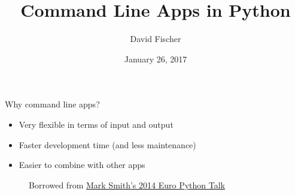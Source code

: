 \documentclass[handout]{beamer}
\title{Command Line Apps in Python}
\author{David Fischer}
\date{January 26, 2017}
\begin{document}
\maketitle

\begin{frame}
\frametitle{}
  {\huge Why command line apps?}
\end{frame}


\begin{frame}
  \begin{itemize}
    \item Very flexible in terms of input and output
    \item Faster development time (and less maintenance)
    \item Easier to combine with other apps
  \end{itemize}
\end{frame}


\begin{frame}
  \begin{figure}[p]
    \centering
    \caption{Borrowed from \href{http://pyvideo.org/europython-2014/writing-awesome-command-line-programs-in-python.html}{Mark Smith's 2014 Euro Python Talk}}
  \end{figure}
\end{frame}
\end{document}

